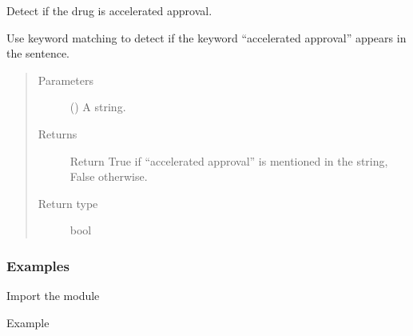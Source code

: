 \documentclass[letterpaper,10pt,english]{sphinxmanual}
\begin{document}

\begin{fulllineitems}
\label{\detokenize{biomarker_extraction:biomarker_extraction.is_accelerated_approval}}
\sphinxAtStartPar
Detect if the drug is accelerated approval.

\sphinxAtStartPar
Use keyword matching to detect if the keyword “accelerated approval” appears in the sentence.
\begin{quote}\begin{description}
\item[{Parameters}] \leavevmode
\sphinxAtStartPar
{} () \textendash{} A string.

\item[{Returns}] \leavevmode
\sphinxAtStartPar
Return True if “accelerated approval” is mentioned in the string, False otherwise.

\item[{Return type}] \leavevmode
\sphinxAtStartPar
bool

\end{description}\end{quote}
\subsubsection*{Examples}

\sphinxAtStartPar
Import the module

\begin{sphinxVerbatim}[commandchars=\\\{\}]
   
\end{sphinxVerbatim}

\sphinxAtStartPar
Example

\begin{sphinxVerbatim}[commandchars=\\\{\}]
  
  
\end{sphinxVerbatim}

\end{fulllineitems}
\end{document}
